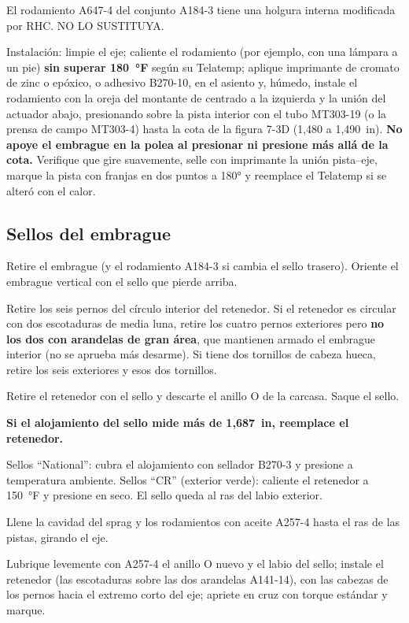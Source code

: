 \begin{advertencia}
El rodamiento A647-4 del conjunto A184-3 tiene una holgura interna modificada por RHC. NO LO SUSTITUYA.
\end{advertencia}

Instalación: limpie el eje; caliente el rodamiento (por ejemplo, con una lámpara a un pie) \textbf{sin superar 180~°F} según su Telatemp; aplique imprimante de cromato de zinc o epóxico, o adhesivo B270-10, en el asiento y, húmedo, instale el rodamiento con la oreja del montante de centrado a la izquierda y la unión del actuador abajo, presionando sobre la pista interior con el tubo MT303-19 (o la prensa de campo MT303-4) hasta la cota de la figura 7-3D (1,480 a 1,490~in). \textbf{No apoye el embrague en la polea al presionar ni presione más allá de la cota.} Verifique que gire suavemente, selle con imprimante la unión pista--eje, marque la pista con franjas en dos puntos a 180° y reemplace el Telatemp si se alteró con el calor.

\subsection{Sellos del embrague}

\begin{pasos}
\item Retire el embrague (y el rodamiento A184-3 si cambia el sello trasero). Oriente el embrague vertical con el sello que pierde arriba.
\item Retire los seis pernos del círculo interior del retenedor. Si el retenedor es circular con dos escotaduras de media luna, retire los cuatro pernos exteriores pero \textbf{no los dos con arandelas de gran área}, que mantienen armado el embrague interior (no se aprueba más desarme). Si tiene dos tornillos de cabeza hueca, retire los seis exteriores y esos dos tornillos.
\item Retire el retenedor con el sello y descarte el anillo O de la carcasa. Saque el sello.
\item \textbf{Si el alojamiento del sello mide más de 1,687~in, reemplace el retenedor.}
\item Sellos ``National'': cubra el alojamiento con sellador B270-3 y presione a temperatura ambiente. Sellos ``CR'' (exterior verde): caliente el retenedor a 150~°F y presione en seco. El sello queda al ras del labio exterior.
\item Llene la cavidad del sprag y los rodamientos con aceite A257-4 hasta el ras de las pistas, girando el eje.
\item Lubrique levemente con A257-4 el anillo O nuevo y el labio del sello; instale el retenedor (las escotaduras sobre las dos arandelas A141-14), con las cabezas de los pernos hacia el extremo corto del eje; apriete en cruz con torque estándar y marque.
\end{pasos}

